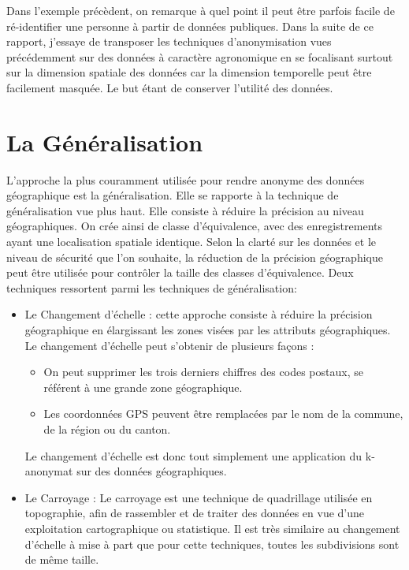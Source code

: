 Dans l'exemple précèdent, on remarque à quel point il peut être parfois facile de ré-identifier une personne à partir de données publiques. Dans la suite de ce rapport, j'essaye de transposer  les techniques d'anonymisation vues précédemment sur des données à caractère agronomique en se focalisant surtout sur la dimension spatiale des données car la dimension temporelle peut être facilement masquée. Le but étant de conserver l'utilité des données.

\section{La Généralisation}
L'approche la plus couramment utilisée pour rendre anonyme des données géographique est la généralisation. Elle se rapporte à la technique de généralisation vue plus haut. Elle consiste à réduire la précision au niveau géographiques. On crée ainsi de classe d’équivalence, avec des enregistrements ayant une localisation spatiale identique. Selon la clarté sur les données et le niveau de sécurité que l’on souhaite, la réduction de la précision géographique peut être utilisée pour contrôler la taille des classes d’équivalence. Deux techniques ressortent parmi les techniques de généralisation:  
\begin{itemize}
    \item Le Changement d’échelle : cette approche consiste à réduire la précision géographique en élargissant les zones visées par les attributs géographiques. Le changement d'échelle peut s'obtenir de plusieurs façons : \begin{itemize}
        \item  On peut supprimer les trois derniers chiffres des codes postaux, se référent à une grande zone géographique.
        \item   Les coordonnées GPS peuvent être remplacées par le nom de la commune, de la région ou du canton.
    \end{itemize} 
    Le changement d’échelle est donc tout simplement une application du k-anonymat sur des données géographiques. 
    \item   Le Carroyage : Le carroyage est une technique de quadrillage utilisée en topographie, afin de rassembler et de traiter des données en vue d’une exploitation cartographique ou statistique. Il est très similaire au changement d’échelle à mise à part que pour cette techniques, toutes les subdivisions sont de même taille.
\end{itemize}

